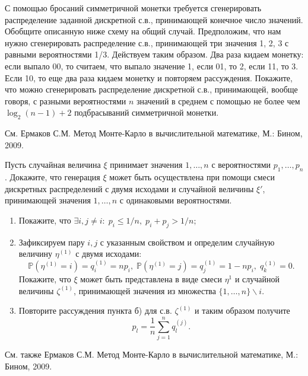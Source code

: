 \begin{problem}
С помощью бросаний симметричной монетки требуется сгенерировать распределение заданной дискретной с.в., принимающей конечное число значений. Обобщите описанную ниже схему на общий случай. Предположим, что нам нужно сгенерировать распределение с.в., принимающей три значения 1, 2, 3 с равными вероятностями 1/3. Действуем таким образом. Два раза кидаем монетку: если выпало 00, то считаем, что выпало значение 1, если 01, то 2, если 11, то 3. Если 10, то еще два раза кидаем монетку и повторяем рассуждения. Покажите, что можно сгенерировать распределение дискретной с.в., принимающей, вообще говоря, с разными вероятностями $n$ значений в среднем с помощью не более чем $\log_2 (n - 1) + 2$ подбрасываний симметричной монетки.
\end{problem}
\begin{remark}
См. Ермаков С.М. Метод Монте-Карло в вычислительной математике, М.: Бином, 2009.
\end{remark}

\begin{problem}
Пусть случайная величина $\xi$ принимает значения $1, \ldots, n$ с вероятностями $p_1, \ldots, p_n$. Докажите, что генерация $\xi$ может быть осуществлена при помощи смеси дискретных распределений с двумя исходами и случайной величины $\xi'$, принимающей значения $1, \ldots, n$ с одинаковыми вероятностями. 
\end{problem}

\begin{ordre}
\begin{enumerate}
\item Покажите, что $\exists i, j \neq i: \;  p_i \leq 1/n, \; p_i + p_j > 1/n;$
\item Зафиксируем пару $i, j$ с указанным свойством и определим случайную величину $\eta^{(1)}$ с двумя исходами:
\[
\mathbb{P}(\eta^{(1)}=i)=q_i^{(1)} = n p_i, \; \mathbb{P}(\eta^{(1)}=j)=q_j^{(1)} = 1 - n p_i, \; q_k^{(1)} = 0.   
\]
Покажите, что $\xi$ может быть представлена в виде смеси $\eta^{1}$ и случайной величины $\zeta^{(1)}$, принимающей значения из множества $\{1, \ldots, n\} \backslash i$. 
\item Повторите рассуждения пункта б) для с.в. $\zeta^{(1)}$ и таким образом получите%
\[
p_l = \frac{1}{n} \sum \limits_{j=1}^n q_l^{(j)}.
\]
\end{enumerate}

См. также  Ермаков С.М. Метод Монте-Карло в вычислительной математике, М.: Бином, 2009.
\end{ordre}

